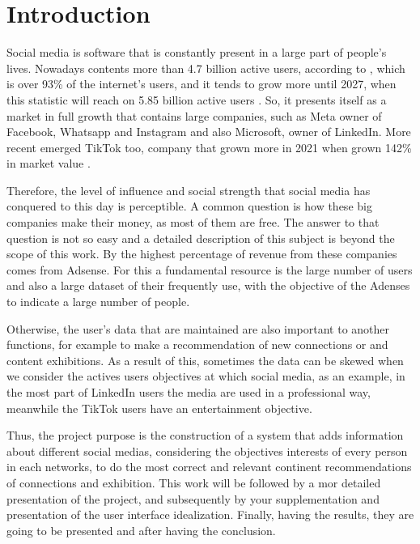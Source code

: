 \chapter{Introduction}
\label{cha:intro}

Social media is software that is constantly present in a large part of people's lives. Nowadays contents more than 4.7 billion active users, according to \cite{statista}, which is over 93\% of the internet's users, and it tends to grow more until 2027, when this statistic will reach on 5.85 billion active users \cite{statista_util_2027}. So, it presents itself as a market in full growth that contains large companies, such as Meta owner of Facebook, Whatsapp and Instagram and also Microsoft, owner of LinkedIn. More recent emerged TikTok too, company that grown more in 2021 when grown 142\% in market value \cite{growth_tiktok}.

Therefore, the level of influence and social strength that social media has conquered to this day is perceptible. A common question is how these big companies make their money, as most of them are free. The answer to that question is not so easy and a detailed description of this subject is beyond the scope of this work. By \cite{investopedia} the highest percentage of revenue from these companies comes from Adsense. For this a fundamental resource is the large number of users and also a large dataset of their frequently use, with the objective of the Adenses to indicate a large number of people.

Otherwise, the user’s data that are maintained are also important to another functions, for example to make a recommendation of new connections or and content exhibitions. As a result of this, sometimes the data can be skewed when we consider the actives users objectives at which social media, as an example, in the most part of LinkedIn users the media are used in a professional way, meanwhile the TikTok users have an entertainment objective.

Thus, the project purpose is the construction of a system that adds information about different social medias, considering the objectives interests of every person in each networks, to do the most correct and relevant continent recommendations of connections and exhibition. This work will be followed by a mor detailed presentation of the project, and subsequently by your supplementation and presentation of the user interface idealization. Finally, having the results, they are going to be presented and after having the conclusion.



